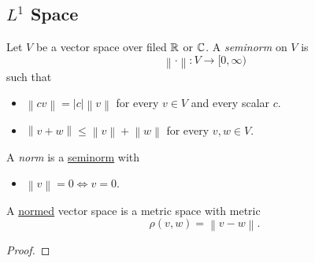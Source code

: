 \subsection{\(L^1\) Space}
\begin{definition}[Seminorm]\label{def:seminorm}
	Let \(V\) be a vector space over filed \(\mathbb{\MakeUppercase{r}} \) or \(\mathbb{\MakeUppercase{c}} \).
	A \emph{seminorm} on \(V\) is
	\[
		\left\lVert \cdot\right\rVert \colon V\to [0, \infty )
	\]
	such that
	\begin{itemize}
		\item \(\left\lVert c v\right\rVert =\left\vert c \right\vert \left\lVert v\right\rVert \) for every \(v\in V\) and every scalar \(c\).
		\item \(\left\lVert  v+w\right\rVert \leq \left\lVert v\right\rVert +\left\lVert w\right\rVert \) for every \(v, w\in V\).
	\end{itemize}
\end{definition}
\begin{definition}[Norm]\label{def:norm}
	A \emph{norm} is a \hyperref[def:seminorm]{seminorm} with
	\begin{itemize}
		\item \(\left\lVert v\right\rVert = 0 \iff v = 0\).
	\end{itemize}
\end{definition}

\begin{lemma}
	A \hyperref[def:norm]{normed} vector space is a metric space with metric
	\[
		\rho (v, w) = \left\lVert v - w\right\rVert.
	\]
\end{lemma}
\begin{proof}
\end{proof}


